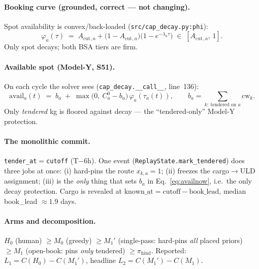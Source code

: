 \documentclass[11pt]{article}
\newcommand{\cw}{\mathrm{cw}}
\newcommand{\Acut}{A_{\mathrm{cut}}}
\newcommand{\Cz}{C^{0}}
\newcommand{\avail}{\mathrm{avail}}
\newcommand{\code}[1]{\texttt{#1}}
\begin{document}
\paragraph{Booking curve (grounded, correct --- not changing).} Spot availability is convex/back-loaded
(\code{src/cap\_decay.py:phi}):
\begin{equation}\label{eq:phi}
\varphi_a(\tau) \;=\; \Acut{}_{,a} + \bigl(1-\Acut{}_{,a}\bigr)\bigl(1-e^{-\lambda_a \tau}\bigr)\;\in\;[\Acut{}_{,a},\,1].
\end{equation}
Only spot decays; both BSA tiers are firm.

\paragraph{Available spot (Model-Y, S51).} On each cycle the solver sees
(\code{cap\_decay.\_\_call\_\_}, line~136):
\begin{equation}\label{eq:availnow}
\avail_a(t) \;=\; b_a \;+\; \max\!\bigl(0,\ \Cz_a - b_a\bigr)\,\varphi_a(\tau_a(t)),
\qquad
b_a=\!\!\sum_{k:\ \text{tendered on }a}\!\!\cw_k .
\end{equation}
Only \emph{tendered} kg is floored against decay --- the ``tendered-only'' Model-Y protection.

\paragraph{The monolithic commit.} \code{tender\_at}${}={}$\code{cutoff} (T$-$6h). One event
(\code{ReplayState.mark\_tendered}) does three jobs at once: (i) hard-pins the route $x_{k,a}\!=\!1$;
(ii) freezes the cargo$\to$ULD assignment; (iii) is the \emph{only} thing that sets $b_a$ in
Eq.~\eqref{eq:availnow}, i.e.\ the only decay protection. Cargo is revealed at
$\text{known\_at}=\text{cutoff}-\text{book\_lead}$, median book\_lead $\approx1.9$ days.

\paragraph{Arms and decomposition.} $H_0$ (human) $\ge M_0$ (greedy) $\ge M_1'$ (single-pass: hard-pins
\emph{all} placed priors) $\ge M_1$ (open-book: pins \emph{only} tendered) $\ge \pi_{\text{hind}}$.
Reported: $L_1=C(H_0)-C(M_1')$, headline $L_2=C(M_1')-C(M_1)$.
\end{document}
